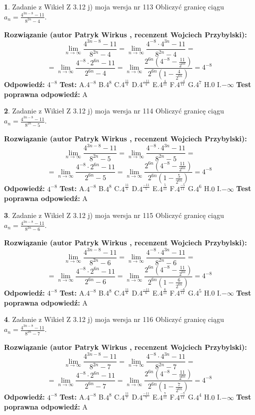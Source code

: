 \documentclass[12pt, a4paper]{article}
\theoremstyle{definition} %
\newtheorem{zad}{}
\newcommand{\zadStart}[1]{\begin{zad}#1\newline}
\newcommand{\zadStop}{\end{zad}}
\newcommand{\rozwStart}[2]{\noindent \textbf{Rozwiązanie (autor #1 , recenzent #2): }\newline}
\newcommand{\rozwStop}{\newline}
\newcommand{\odpStart}{\noindent \textbf{Odpowiedź:}\newline}
\newcommand{\odpStop}{\newline}
\newcommand{\testStart}{\noindent \textbf{Test:}\newline}
\newcommand{\testStop}{\newline}
\newcommand{\kluczStart}{\noindent \textbf{Test poprawna odpowiedź:}\newline}
\newcommand{\kluczStop}{\newline}
\begin{document}
\zadStart{Zadanie z Wikieł Z 3.12 j) moja wersja nr 113}
Obliczyć granicę ciągu $a_{n}=\frac{4^{3n-8}-11}{8^{2n}-4}$.
\zadStop
\rozwStart{Patryk Wirkus}{Wojciech Przybylski}
$$\lim\limits_{n\to\infty}\frac{4^{3n-8}-11}{8^{2n}-4}= \lim\limits_{n\to\infty}\frac{4^{-8} \cdot 4^{3n}-11}{8^{2n}-4}=$$
$$= \lim\limits_{n\to\infty}\frac{4^{-8} \cdot 2^{6n}-11}{2^{6n}-4}= \lim\limits_{n\to\infty}\frac{2^{6n}(4^{-8} - \frac{11}{2^{6n}})}{2^{6n}(1-\frac{4}{2^{6n}})}= 4^{-8}$$
\rozwStop
\odpStart
$4^{-8}$
\odpStop
\testStart
A.$4^{-8}$
B.$4^{8}$
C.$4^{\frac{11}{4}}$
D.$4^{\frac{-11}{4}}$
E.$4^{\frac{4}{11}}$
F.$4^{\frac{-4}{11}}$
G.$4^{7}$
H.$0$
I.$-\infty$
\testStop
\kluczStart
A
\kluczStop



\zadStart{Zadanie z Wikieł Z 3.12 j) moja wersja nr 114}
Obliczyć granicę ciągu $a_{n}=\frac{4^{3n-8}-11}{8^{2n}-5}$.
\zadStop
\rozwStart{Patryk Wirkus}{Wojciech Przybylski}
$$\lim\limits_{n\to\infty}\frac{4^{3n-8}-11}{8^{2n}-5}= \lim\limits_{n\to\infty}\frac{4^{-8} \cdot 4^{3n}-11}{8^{2n}-5}=$$
$$= \lim\limits_{n\to\infty}\frac{4^{-8} \cdot 2^{6n}-11}{2^{6n}-5}= \lim\limits_{n\to\infty}\frac{2^{6n}(4^{-8} - \frac{11}{2^{6n}})}{2^{6n}(1-\frac{5}{2^{6n}})}= 4^{-8}$$
\rozwStop
\odpStart
$4^{-8}$
\odpStop
\testStart
A.$4^{-8}$
B.$4^{8}$
C.$4^{\frac{11}{5}}$
D.$4^{\frac{-11}{5}}$
E.$4^{\frac{5}{11}}$
F.$4^{\frac{-5}{11}}$
G.$4^{6}$
H.$0$
I.$-\infty$
\testStop
\kluczStart
A
\kluczStop



\zadStart{Zadanie z Wikieł Z 3.12 j) moja wersja nr 115}
Obliczyć granicę ciągu $a_{n}=\frac{4^{3n-8}-11}{8^{2n}-6}$.
\zadStop
\rozwStart{Patryk Wirkus}{Wojciech Przybylski}
$$\lim\limits_{n\to\infty}\frac{4^{3n-8}-11}{8^{2n}-6}= \lim\limits_{n\to\infty}\frac{4^{-8} \cdot 4^{3n}-11}{8^{2n}-6}=$$
$$= \lim\limits_{n\to\infty}\frac{4^{-8} \cdot 2^{6n}-11}{2^{6n}-6}= \lim\limits_{n\to\infty}\frac{2^{6n}(4^{-8} - \frac{11}{2^{6n}})}{2^{6n}(1-\frac{6}{2^{6n}})}= 4^{-8}$$
\rozwStop
\odpStart
$4^{-8}$
\odpStop
\testStart
A.$4^{-8}$
B.$4^{8}$
C.$4^{\frac{11}{6}}$
D.$4^{\frac{-11}{6}}$
E.$4^{\frac{6}{11}}$
F.$4^{\frac{-6}{11}}$
G.$4^{5}$
H.$0$
I.$-\infty$
\testStop
\kluczStart
A
\kluczStop



\zadStart{Zadanie z Wikieł Z 3.12 j) moja wersja nr 116}
Obliczyć granicę ciągu $a_{n}=\frac{4^{3n-8}-11}{8^{2n}-7}$.
\zadStop
\rozwStart{Patryk Wirkus}{Wojciech Przybylski}
$$\lim\limits_{n\to\infty}\frac{4^{3n-8}-11}{8^{2n}-7}= \lim\limits_{n\to\infty}\frac{4^{-8} \cdot 4^{3n}-11}{8^{2n}-7}=$$
$$= \lim\limits_{n\to\infty}\frac{4^{-8} \cdot 2^{6n}-11}{2^{6n}-7}= \lim\limits_{n\to\infty}\frac{2^{6n}(4^{-8} - \frac{11}{2^{6n}})}{2^{6n}(1-\frac{7}{2^{6n}})}= 4^{-8}$$
\rozwStop
\odpStart
$4^{-8}$
\odpStop
\testStart
A.$4^{-8}$
B.$4^{8}$
C.$4^{\frac{11}{7}}$
D.$4^{\frac{-11}{7}}$
E.$4^{\frac{7}{11}}$
F.$4^{\frac{-7}{11}}$
G.$4^{4}$
H.$0$
I.$-\infty$
\testStop
\kluczStart
A
\kluczStop
\end{document}
